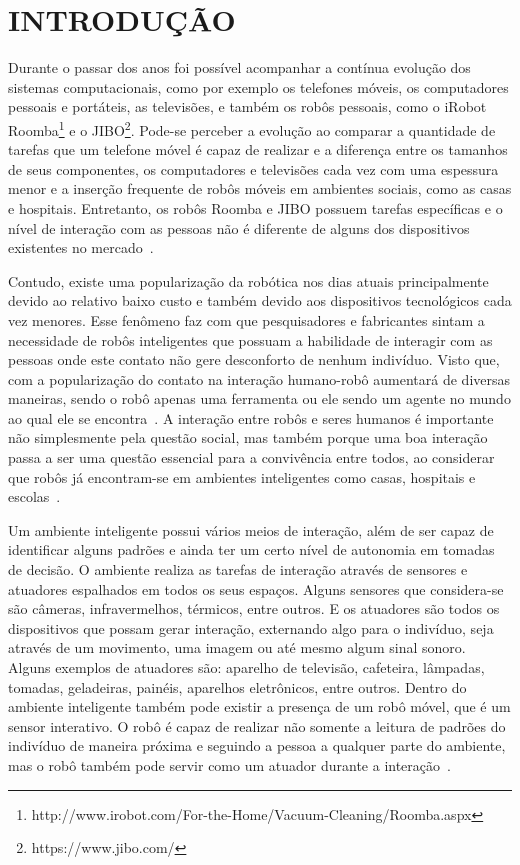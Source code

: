\chapter{INTRODUÇÃO}
\label{cap:introducao}
Durante o passar dos anos foi possível acompanhar a contínua evolução dos sistemas computacionais, como por exemplo os telefones móveis, os computadores pessoais e portáteis, as televisões, e também os robôs pessoais, como o iRobot Roomba\footnote{http://www.irobot.com/For-the-Home/Vacuum-Cleaning/Roomba.aspx} e o JIBO\footnote{https://www.jibo.com/}. Pode-se perceber a evolução ao comparar a quantidade de tarefas que um telefone móvel é capaz de realizar e a diferença entre os tamanhos de seus componentes, os computadores e televisões cada vez com uma espessura menor e a inserção frequente de robôs móveis em ambientes sociais, como as casas e hospitais. Entretanto, os robôs Roomba e JIBO possuem tarefas específicas e o nível de interação com as pessoas não é diferente de alguns dos dispositivos existentes no mercado~\cite{heenan:2014}.

Contudo, existe uma popularização da robótica nos dias atuais principalmente devido ao relativo baixo custo e também devido aos dispositivos tecnológicos cada vez menores. Esse fenômeno faz com que pesquisadores e fabricantes sintam a necessidade de robôs inteligentes que possuam a habilidade de interagir com as pessoas onde este contato não gere desconforto de nenhum indivíduo. Visto que, com a popularização do contato na interação humano-robô aumentará de diversas maneiras, sendo o robô apenas uma ferramenta ou ele sendo um agente no mundo ao qual ele se encontra~\cite{looi:2012}. A interação entre robôs e seres humanos é importante não simplesmente pela questão social, mas também porque uma boa interação passa a ser uma questão essencial para a convivência entre todos, ao considerar que robôs já encontram-se em ambientes inteligentes como casas, hospitais e escolas~\cite{albo-canals:2013, brown:2013}.

Um ambiente inteligente possui vários meios de interação, além de ser capaz de identificar alguns padrões e ainda ter um certo nível de autonomia em tomadas de decisão. O ambiente realiza as tarefas de interação através de sensores e atuadores espalhados em todos os seus espaços. Alguns sensores que considera-se são câmeras, infravermelhos, térmicos, entre outros. E os atuadores são todos os dispositivos que possam gerar interação, externando algo para o indivíduo, seja através de um movimento, uma imagem ou até mesmo algum sinal sonoro. Alguns exemplos de atuadores são: aparelho de televisão, cafeteira, lâmpadas, tomadas, geladeiras, painéis, aparelhos eletrônicos, entre outros. Dentro do ambiente inteligente também pode existir a presença de um robô móvel, que é um sensor interativo. O robô é capaz de realizar não somente a leitura de padrões do indivíduo de maneira próxima e seguindo a pessoa a qualquer parte do ambiente, mas o robô também pode servir como um atuador durante a interação~\cite{looi:2012, choi:2014, dobra:2014}.

